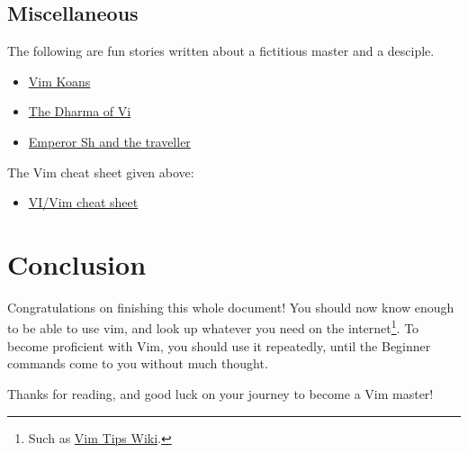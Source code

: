 \documentclass[11pt]{article}
\begin{document}
\subsection{Miscellaneous}
\label{sec:orge4e10e3}
The following are fun stories written about a fictitious master
and a desciple.
\begin{itemize}
\item \href{https://sanctum.geek.nz/arabesque/vim-koans/}{Vim Koans}
\item \href{https://blog.samwhited.com/2015/04/the-dharma-of-vi/}{The Dharma of Vi}
\item \href{https://sanctum.geek.nz/etc/emperor-sh-and-the-traveller.txt}{Emperor Sh and the traveller}
\end{itemize}

The Vim cheat sheet given above:
\begin{itemize}
\item \href{http://www.viemu.com/a\_vi\_vim\_graphical\_cheat\_sheet\_tutorial.html}{VI/Vim cheat sheet}
\end{itemize}
\section{Conclusion}
\label{sec:org0a26cd8}
Congratulations on finishing this whole document! You should now know enough to
be able to use vim, and look up whatever you need on the internet\footnote{Such as \href{http://vim.wikia.com/wiki/Vim\_Tips\_Wiki}{Vim Tips Wiki}.}. To
become proficient with Vim, you should use it repeatedly, until the Beginner
commands come to you without much thought.

Thanks for reading, and good luck on your journey to become a Vim master!
\end{document}

